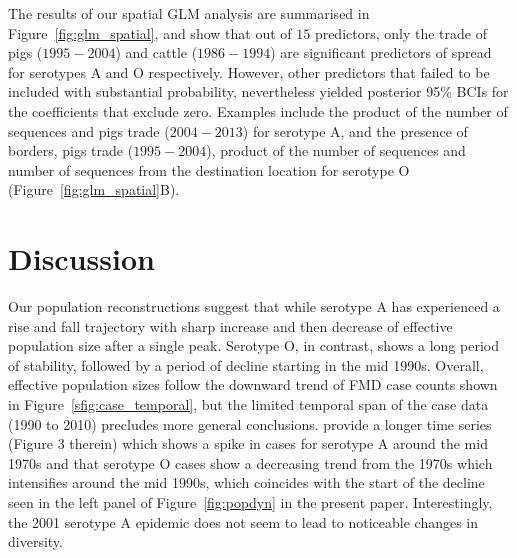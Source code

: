 \documentclass[10pt]{article}
\begin{document}
The results of our spatial GLM analysis are summarised in Figure~\ref{fig:glm_spatial}, and show that out of $15$ predictors, only the trade of pigs ($1995-2004$) and cattle ($1986-1994$) are significant predictors of spread for serotypes A and O respectively.
However, other predictors that failed to be included with substantial probability, nevertheless yielded posterior 95\% BCIs for the coefficients that exclude zero.
Examples include the product of the number of sequences and pigs trade ($2004-2013$) for serotype A, and the presence of borders, pigs trade ($1995-2004$), product of the number of sequences and number of sequences from the destination location for serotype O (Figure~\ref{fig:glm_spatial}B).

\section*{Discussion}

Our population reconstructions suggest that while serotype A has experienced a rise and fall trajectory with sharp increase and then decrease of effective population size after a single peak.
Serotype O, in contrast, shows a long period of stability, followed by a period of decline starting in the mid 1990s.
Overall, effective population sizes follow the downward trend of FMD case counts shown in Figure~\ref{sfig:case_temporal}, but the limited temporal span of the case data (1990 to 2010) precludes more general conclusions.
\cite{Naranjo2013} provide a longer time series (Figure 3 therein) which shows a spike in cases for serotype A around the mid 1970s and that serotype O cases show a decreasing trend from the 1970s which intensifies around the mid 1990s, which coincides with the start of the decline seen in the left panel of Figure~\ref{fig:popdyn} in the present paper.
Interestingly, the 2001 serotype A epidemic does not seem to lead to noticeable changes in diversity.
\end{document}
